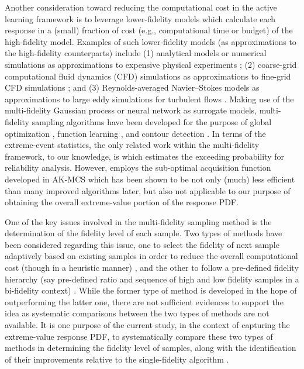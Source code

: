 \documentclass[11pt]{article}
\begin{document}
Another consideration toward reducing the computational cost in the active learning framework is to leverage lower-fidelity models which calculate each response in a (small) fraction of cost (e.g., computational time or budget) of the high-fidelity model. Examples of such lower-fidelity models (as approximations to the high-fidelity counterparts) include (1) analytical models or numerical simulations as approximations to expensive physical experiments \cite{perdikaris2017nonlinear, marco2017virtual}; (2) coarse-grid computational fluid dynamics (CFD) simulations as approximations to fine-grid CFD simulations \cite{zheng2020multifidelity}; and (3) Reynolds-averaged Navier–Stokes models as approximations to large eddy simulations for turbulent flows \cite{wilcox1998turbulence}. Making use of the multi-fidelity Gaussian process \cite{kennedy2000predicting, perdikaris2017nonlinear} or neural network \cite{meng2020composite,meng2021multi} as surrogate models, multi-fidelity sampling algorithms have been developed for the purpose of global optimization \cite{song2019general, sarkar2019multifidelity}, function learning \cite{meng2021multi}, and contour detection \cite{marques2018contour}. In terms of the extreme-event statistics, the only related work within the multi-fidelity framework, to our knowledge, is \cite{yi2021active} which estimates the exceeding probability for reliability analysis. However, \cite{yi2021active} employs the sub-optimal acquisition function developed in AK-MCS which has been shown to be not only (much) less efficient than many improved algorithms later, but also not applicable to our purpose of obtaining the overall extreme-value portion of the response PDF. 

One of the key issues involved in the multi-fidelity sampling method is the determination of the fidelity level of each sample. Two types of methods have been considered regarding this issue, one to select the fidelity of next sample adaptively based on existing samples in order to reduce the overall computational cost (though in a heuristic manner) \cite{marques2018contour, marco2017virtual}, and the other to follow a pre-defined fidelity hierarchy (say pre-defined ratio and sequence of high and low fidelity samples in a bi-fidelity context) \cite{sarkar2019multifidelity, zheng2020multifidelity}. While the former type of method is developed in the hope of outperforming the latter one, there are not sufficient evidences to support the idea as systematic comparisons between the two types of methods are not available. It is one purpose of the current study, in the context of capturing the extreme-value response PDF, to systematically compare these two types of methods in determining the fidelity level of samples, along with the identification of their improvements relative to the single-fidelity algorithm \cite{blanchard2021output}.
\end{document}
